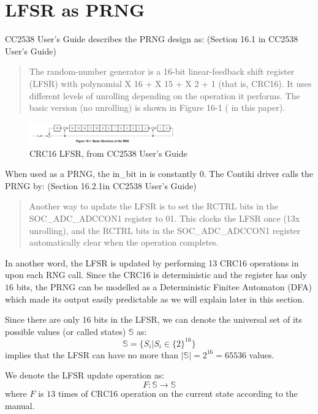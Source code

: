 \section{LFSR as PRNG} \label{LFSR}

CC2538 User's Guide describes the PRNG design as: (Section 16.1 in CC2538 User's Guide)
\begin{quote}
The random-number generator is a 16-bit linear-feedback shift register (LFSR) with polynomial X 16 + X 15 +
X 2 + 1 (that is, CRC16). It uses different levels of unrolling depending on the operation it performs. The basic version (no unrolling) is shown in Figure 16-1 ( in this paper).
\end{quote}

\begin{figure}[!t]
\centering
\includegraphics[width=2.5in]{fig/crc16.png}
\caption{CRC16 LFSR, from CC2538 User's Guide}
\label{CRC16}
\end{figure}

When used as a PRNG, the in\_bit in  is constantly $0$. The Contiki driver calls the PRNG by: (Section 16.2.1in CC2538 User's Guide)
\begin{quote}
Another way to update the LFSR is to set the RCTRL bits in the SOC\_ADC\_ADCCON1 register to 01. This clocks the LFSR once (13x unrolling), and the RCTRL bits in the SOC\_ADC\_ADCCON1 register automatically clear when the operation completes.
\end{quote}

In another word, the LFSR is updated by performing 13 CRC16 operations in  upon each RNG call. Since the CRC16 is deterministic and the register has only $16$ bits, the PRNG can be modelled as a Deterministic Finitee Automaton (DFA) which made its output easily predictable as we will explain later in this section.

Since there are only 16 bits in the LFSR, we can denote the universal set of its  possible values (or called states) $\mathbb{S}$ as:
\begin{equation} \label{PRNGState}
\mathbb{S} = \{ S_{i} | S_{i} \in \{2\}^{16}\}
\end{equation}
 implies that the LFSR can have no more than $|\mathbb{S}| = 2^{16} = 65536$ values.

We denote the LFSR update operation as:
\begin{equation}
F:\mathbb{S} \rightarrow \mathbb{S}
\end{equation}
where $F$ is $13$ times of CRC16 operation on the current state according to the manual.


